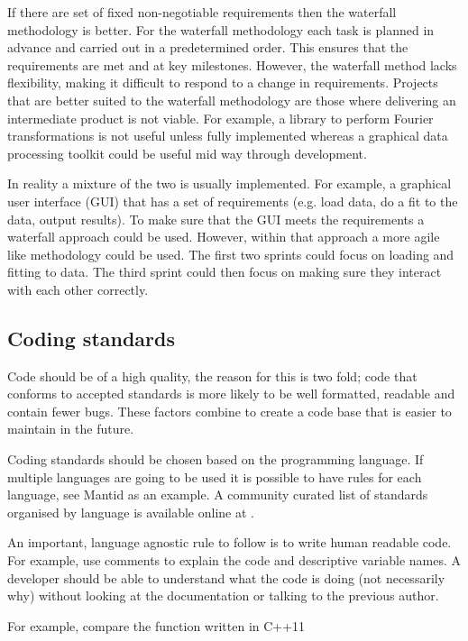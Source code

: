 \documentclass[jnr]{iosart2x}
\begin{document}
\begin{itemzie}
If there are set of fixed non-negotiable requirements then the waterfall methodology is better.
For the waterfall methodology each task is planned in advance and carried out in a predetermined order.
This ensures that the requirements are met and at key milestones.
However, the waterfall method lacks flexibility, making it difficult to respond to a change in requirements.
Projects that are better suited to the waterfall methodology are those where delivering an intermediate product is not viable.
For example, a library to perform Fourier transformations is not useful unless fully implemented whereas a graphical data processing toolkit could be useful mid way through development.

In reality a mixture of the two is usually implemented.
For example, a graphical user interface (GUI) that has a set of requirements (e.g. load data, do a fit to the data, output results).
To make sure that the GUI meets the requirements a waterfall approach could be used.
However, within that approach a more agile like methodology could be used.
The first two sprints could focus on loading and fitting to data.
The third sprint could then focus on making sure they interact with each other correctly.

\subsection{Coding standards}
\label{Coding standards}

Code should be of a high quality, the reason for this is two fold; code that conforms to accepted standards is more likely to be well formatted, readable and contain fewer bugs.
These factors combine to create a code base that is easier to maintain in the future.

Coding standards should be chosen based on the programming language.
If multiple languages are going to be used it is possible to have rules for each language, see Mantid as an example.
A community curated list of standards organised by language is available online at \cite{Awesome_Guidelines}.

An important, language agnostic rule to follow is to write human readable code.
For example, use comments to explain the code and descriptive variable names.
A developer should be able to understand what the code is doing (not necessarily why) without looking at the documentation or talking to the previous author.

For example, compare the function \cite{Lim_2015} written in C++11


\end{itemzie}
\end{document}
